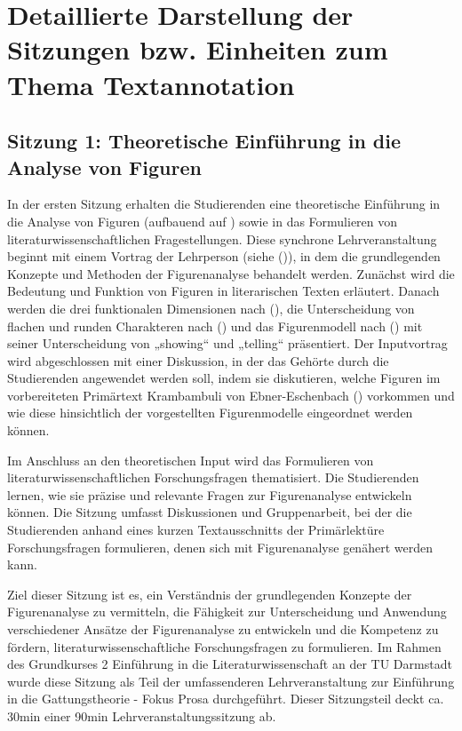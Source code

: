 \documentclass[
          a4paper,
        ]{article}
\begin{document}
\section{Detaillierte Darstellung der Sitzungen bzw. Einheiten zum Thema
Textannotation}\label{detaillierte-darstellung-der-sitzungen-bzw.-einheiten-zum-thema-textannotation}

\subsection{Sitzung 1: Theoretische Einführung in die Analyse von
Figuren}\label{sitzung-1-theoretische-einfuxfchrung-in-die-analyse-von-figuren}

In der ersten Sitzung erhalten die Studierenden eine theoretische
Einführung in die Analyse von Figuren (aufbauend auf
) sowie in das Formulieren
von literaturwissenschaftlichen Fragestellungen. Diese synchrone
Lehrveranstaltung beginnt mit einem Vortrag der Lehrperson (siehe
()), in
dem die grundlegenden Konzepte und Methoden der Figurenanalyse behandelt
werden. Zunächst wird die Bedeutung und Funktion von Figuren in
literarischen Texten erläutert. Danach werden die drei funktionalen
Dimensionen nach (),
die Unterscheidung von flachen und runden Charakteren nach
() und das
Figurenmodell nach ()
mit seiner Unterscheidung von „showing`` und „telling`` präsentiert. Der
Inputvortrag wird abgeschlossen mit einer Diskussion, in der das Gehörte
durch die Studierenden angewendet werden soll, indem sie diskutieren,
welche Figuren im vorbereiteten Primärtext Krambambuli von
Ebner-Eschenbach ()
vorkommen und wie diese hinsichtlich der vorgestellten Figurenmodelle
eingeordnet werden können.

Im Anschluss an den theoretischen Input wird das Formulieren von
literaturwissenschaftlichen Forschungsfragen thematisiert. Die
Studierenden lernen, wie sie präzise und relevante Fragen zur
Figurenanalyse entwickeln können. Die Sitzung umfasst Diskussionen und
Gruppenarbeit, bei der die Studierenden anhand eines kurzen
Textausschnitts der Primärlektüre Forschungsfragen formulieren, denen
sich mit Figurenanalyse genähert werden kann.

Ziel dieser Sitzung ist es, ein Verständnis der grundlegenden Konzepte
der Figurenanalyse zu vermitteln, die Fähigkeit zur Unterscheidung und
Anwendung verschiedener Ansätze der Figurenanalyse zu entwickeln und die
Kompetenz zu fördern, literaturwissenschaftliche Forschungsfragen zu
formulieren. Im Rahmen des Grundkurses 2 Einführung in die
Literaturwissenschaft an der TU Darmstadt wurde diese Sitzung als Teil
der umfassenderen Lehrveranstaltung zur Einführung in die
Gattungstheorie - Fokus Prosa durchgeführt. Dieser Sitzungsteil deckt
ca. 30min einer 90min Lehrveranstaltungssitzung ab.
\end{document}
